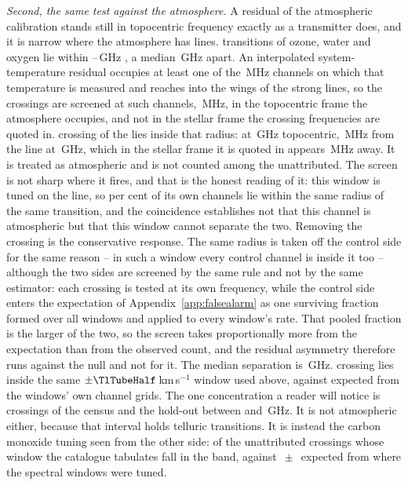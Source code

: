 \emph{Second, the same test against the atmosphere.} A residual of the
atmospheric calibration stands still in topocentric frequency exactly as a
transmitter does, and it is narrow where the atmosphere has lines.
\TlNLine{} transitions of ozone, water and oxygen lie within
\TlFreqLo--\TlFreqHi\,GHz \citep{Pickett1998}, a median \TlSpacing\,GHz
apart. An interpolated system-temperature residual occupies at least one of
the \CdSpecTsysRes\,MHz channels on which that temperature is measured and reaches
into the wings of the strong lines, so the crossings are screened at
\ScNTsysChan{} such channels, \ScRadMHz\,MHz, in the topocentric frame the atmosphere occupies, and not in the stellar frame the crossing frequencies are quoted in. \ScNInRad{} crossing of the \TlNCross{} lies inside that radius:
\ScNearStar{} at \ScNearFTopo\,GHz topocentric, \ScNearOffMHz\,MHz from the
\ScNearSpecies{} line at \ScNearLine\,GHz, which in the stellar frame it is
quoted in appears \ScNearOffStarMHz\,MHz away. It is treated as atmospheric
and is not counted among the unattributed. The screen is not sharp where it
fires, and that is the honest reading of it: this window is tuned on the
line, so \ScNearWinPct{} per cent of its own channels lie within the same
radius of the same transition, and the coincidence establishes not that
this channel is atmospheric but that this window cannot separate the two. Removing the crossing is the conservative response. The same radius is
taken off the control side for the same reason -- in such a window every
control channel is inside it too -- although the two sides are screened by
the same rule and not by the same estimator: each crossing is tested at its
own frequency, while the control side enters the expectation of
Appendix~\ref{app:falsealarm} as one surviving fraction formed over all
windows and applied to every window's rate. That pooled fraction is the
larger of the two, so the screen takes proportionally more from the
expectation than from the observed count, and the residual asymmetry
therefore runs against the null and not for it. The median separation is
\TlOffMed\,GHz. \TlTubeObs{} crossing lies inside the
same $\pm\TlTubeHalf$\,km\,s$^{-1}$ window used above, against
\TlTubeNull{} expected from the windows' own channel grids. The one
concentration a reader will notice is \TlBandAll{} crossings of the census
and the hold-out between \TlBandLo{} and \TlBandHi\,GHz. It is not
atmospheric either, because that interval holds \TlBandNLine{} telluric
transitions. It is instead the carbon monoxide tuning seen from the
other side: \TlBandObs{} of the \TlBandNSub{} unattributed crossings whose
window the catalogue tabulates fall in the band, against
\TlBandNull$\,\pm\,$\TlBandNullSd{} expected from where the spectral windows
were tuned.

